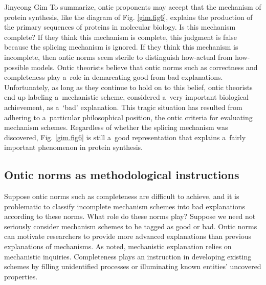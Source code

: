\begin{artengenv}{Jinyeong Gim}
To summarize, ontic proponents may accept that the mechanism of protein synthesis, like the diagram of Fig. \ref{gim.fig6}, explains the production of the primary sequences of proteins in molecular biology. Is this mechanism complete? If they think this mechanism is complete, this judgment is false because the splicing mechanism is ignored. If they think this mechanism is incomplete, then ontic norms seem sterile to distinguish how-actual from how-possible models. Ontic theorists believe that ontic norms such as correctness and completeness play a~role in demarcating good from bad explanations. Unfortunately, as long as they continue to hold on to this belief, ontic theorists end up labeling a~mechanistic scheme, considered a~very important biological achievement, as a~‘bad' explanation. This tragic situation has resulted from adhering to a~particular philosophical position, the ontic criteria for evaluating mechanism schemes. Regardless of whether the splicing mechanism was discovered, Fig. \ref{gim.fig6} is still a~good representation that explains a~fairly important phenomenon in protein synthesis.

\subsection{Ontic norms as methodological instructions}

Suppose ontic norms such as completeness are difficult to achieve, and it is problematic to classify incomplete mechanism schemes into bad explanations according to these norms. What role do these norms play? Suppose we need not seriously consider mechanism schemes to be tagged as good or bad. Ontic norms can motivate researchers to provide more advanced explanations than previous explanations of mechanisms. As noted, mechanistic explanation relies on mechanistic inquiries. Completeness plays an instruction in developing existing schemes by filling unidentified processes or illuminating known entities' uncovered properties.


\end{artengenv}
